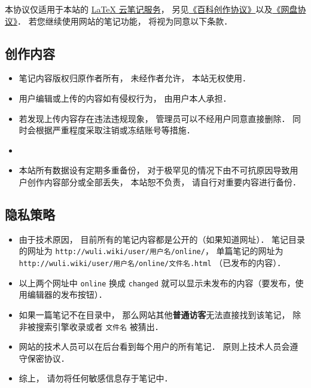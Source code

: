 
本协议仅适用于本站的 \href{http://example.com}{LaTeX 云笔记服务}， 另见\href{http://wuli.wiki/online/licens.html}{《百科创作协议》}以及\href{http://www.example.com}{《网盘协议》}． 若您继续使用网站的笔记功能， 将视为同意以下条款．

\subsection{创作内容}
\begin{itemize}
\item 笔记内容版权归原作者所有， 未经作者允许， 本站无权使用．
\item 用户编辑或上传的内容如有侵权行为， 由用户本人承担．
\item 若发现上传内容存在违法违规现象， 管理员可以不经用户同意直接删除． 同时会根据严重程度采取注销或冻结账号等措施．
\item 
\item 本站所有数据设有定期多重备份， 对于极罕见的情况下由不可抗原因导致用户创作内容部分或全部丢失， 本站恕不负责， 请自行对重要内容进行备份．
\end{itemize}

\subsection{隐私策略}
\begin{itemize}
\item 由于技术原因， 目前所有的笔记内容都是公开的（如果知道网址）． 笔记目录的网址为 \verb|http://wuli.wiki/user/用户名/online/|， 单篇笔记的网址为 \verb|http://wuli.wiki/user/用户名/online/文件名.html| （已发布的内容）．
\item 以上两个网址中 \verb|online| 换成 \verb|changed| 就可以显示未发布的内容（要发布，使用编辑器的发布按钮）．
\item 如果一篇笔记不在目录中， 那么网站其他\textbf{普通访客}无法直接找到该笔记， 除非被搜索引擎收录或者 \verb|文件名| 被猜出．
\item 网站的技术人员可以在后台看到每个用户的所有笔记． 原则上技术人员会遵守保密协议．
\item 综上， 请勿将任何敏感信息存于笔记中．
\end{itemize}
